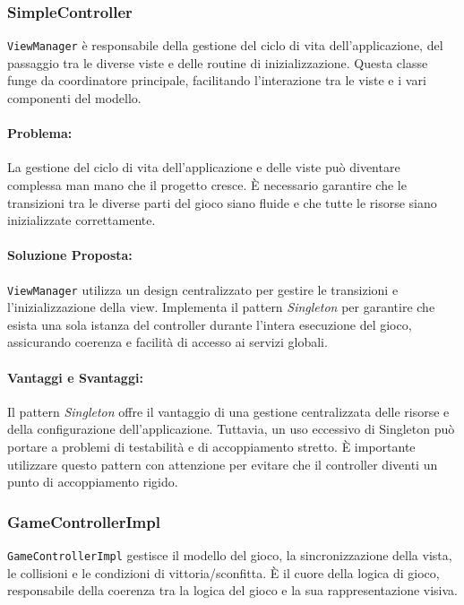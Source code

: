 \documentclass[a4paper,12pt]{report}
\begin{document}
	\subsubsection{SimpleController}
	
	\texttt{ViewManager} è responsabile della gestione del ciclo di vita dell'applicazione, del passaggio tra le diverse viste e delle routine di inizializzazione. Questa classe funge da coordinatore principale, facilitando l'interazione tra le viste e i vari componenti del modello.
	
	\paragraph{Problema:} La gestione del ciclo di vita dell'applicazione e delle viste può diventare complessa man mano che il progetto cresce. È necessario garantire che le transizioni tra le diverse parti del gioco siano fluide e che tutte le risorse siano inizializzate correttamente.
	
	\paragraph{Soluzione Proposta:} \texttt{ViewManager} utilizza un design centralizzato per gestire le transizioni e l'inizializzazione della view. Implementa il pattern \textit{Singleton} per garantire che esista una sola istanza del controller durante l'intera esecuzione del gioco, assicurando coerenza e facilità di accesso ai servizi globali.
	
	\paragraph{Vantaggi e Svantaggi:} 
	Il pattern \textit{Singleton} offre il vantaggio di una gestione centralizzata delle risorse e della configurazione dell'applicazione. Tuttavia, un uso eccessivo di Singleton può portare a problemi di testabilità e di accoppiamento stretto. È importante utilizzare questo pattern con attenzione per evitare che il controller diventi un punto di accoppiamento rigido.
	
	\subsubsection{GameControllerImpl}
	
	\texttt{GameControllerImpl} gestisce il modello del gioco, la sincronizzazione della vista, le collisioni e le condizioni di vittoria/sconfitta. È il cuore della logica di gioco, responsabile della coerenza tra la logica del gioco e la sua rappresentazione visiva.
	
\end{document}
